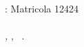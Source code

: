 
\clearpage
{}
\thispagestyle{empty}

\hfill

\vfill

\noindent \myName: Matricola 12424 \\ \\
\noindent \textit{\myTitle,}
\myDegree,
\textcopyright\ \myTime.